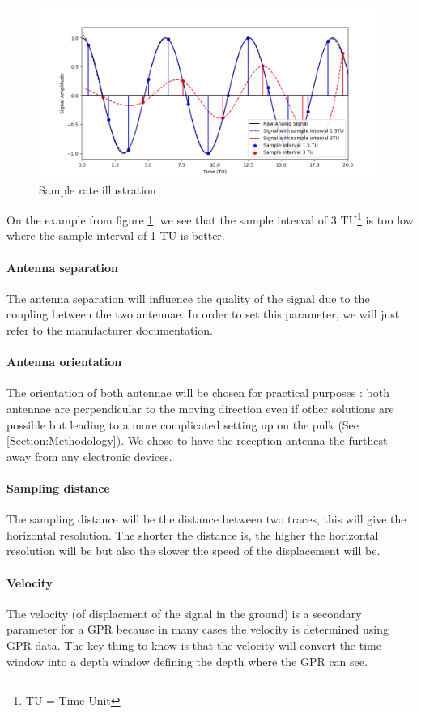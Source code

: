\begin{figure}[H]
    \centering
    \includegraphics[width=0.8\linewidth]{Images/00_Theory/SampleRate.png}
    \caption{Sample rate illustration}
    \label{fig:SampleRate}
\end{figure}

On the example from figure \ref{fig:SampleRate}, we see that the sample interval of 3 TU\footnote{TU = Time Unit} is too low where the sample interval of 1 TU is better.

\paragraph{Antenna separation} The antenna separation will influence the quality of the signal due to the coupling between the two antennae. In order to set this parameter, we will just refer to the manufacturer documentation.

\paragraph{Antenna orientation} The orientation of both antennae will be chosen for practical purposes : both antennae are perpendicular to the moving direction even if other solutions are possible but leading to a more complicated setting up on the pulk (See \ref{Section:Methodology}). We chose to have the reception antenna the furthest away from any electronic devices.


\paragraph{Sampling distance} The sampling distance will be the distance between two traces, this will give the horizontal resolution. The shorter the distance is, the higher the horizontal resolution will be but also the slower the speed of the displacement will be.

\paragraph{Velocity} The velocity (of displacment of the signal in the ground) is a secondary parameter for a GPR because in many cases the velocity is determined using GPR data. The key thing to know is that the velocity will convert the time window into a depth window defining the depth where the GPR can see.


